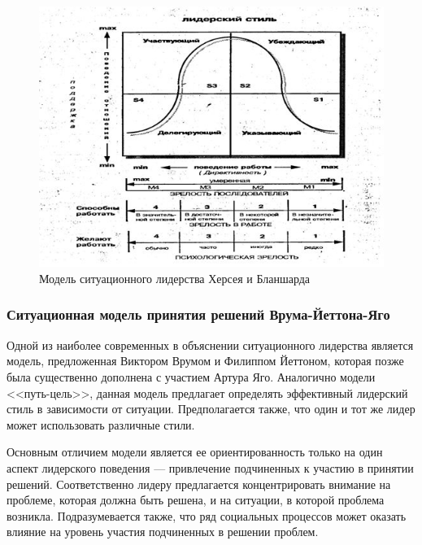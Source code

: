 \documentclass[a4paper,12pt,oneside,final]{extarticle}
\makeatletter
\numberwithin{equation}{section}
\def\maxwidth#1{\ifdim\Gin@nat@width>#1 #1\else\Gin@nat@width\fi}
\makeatother
\begin{document}
\begin{enumerate}
\begin{figure}[h]
	\centering
	\includegraphics[width=\maxwidth{\textwidth}]{management-figures/leadership_hb}
	\caption{Модель ситуационного лидерства Херсея и Бланшарда}
\end{figure}

\subsubsection{Ситуационная модель принятия решений Врума-Йеттона-Яго}
Одной из наиболее современных в объяснении ситуационного лидерства является модель, предложенная Виктором Врумом и Филиппом Йеттоном, которая позже была существенно дополнена с участием Артура Яго. 
Аналогично модели <<путь-цель>>, данная модель предлагает определять эффективный лидерский стиль в зависимости от ситуации. 
Предполагается также, что один и тот же лидер может использовать различные стили. 

Основным отличием модели является ее ориентированность только на один аспект лидерского поведения --- привлечение подчиненных к участию в принятии решений.
Соответственно лидеру предлагается концентрировать внимание на проблеме, которая должна быть решена, и на ситуации, в которой проблема возникла.
Подразумевается также, что ряд социальных процессов может оказать влияние на уровень участия подчиненных в решении проблем.


\end{enumerate}
\end{document}
